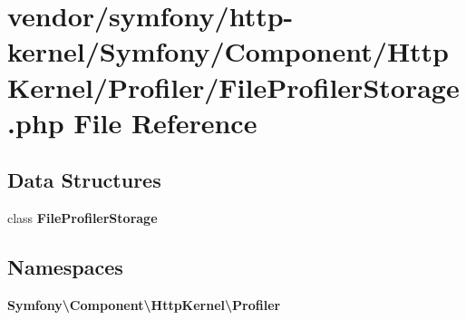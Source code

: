 \section{vendor/symfony/http-\/kernel/\+Symfony/\+Component/\+Http\+Kernel/\+Profiler/\+File\+Profiler\+Storage.php File Reference}
\label{_file_profiler_storage_8php}
\subsection*{Data Structures}
\begin{DoxyCompactItemize}
\item 
class {\bf File\+Profiler\+Storage}
\end{DoxyCompactItemize}
\subsection*{Namespaces}
\begin{DoxyCompactItemize}
\item 
 {\bf Symfony\textbackslash{}\+Component\textbackslash{}\+Http\+Kernel\textbackslash{}\+Profiler}
\end{DoxyCompactItemize}
